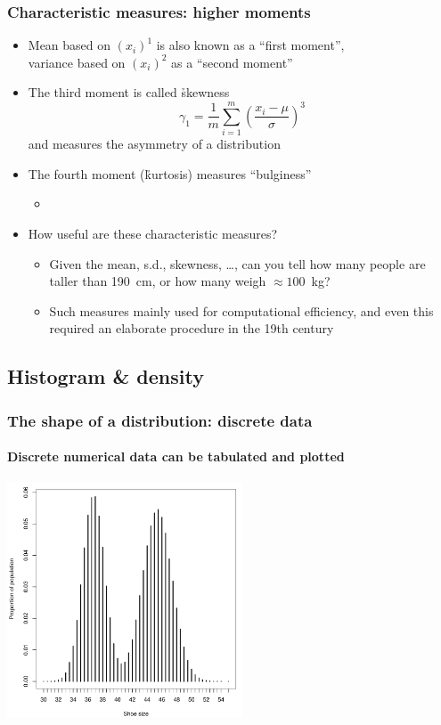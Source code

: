 \documentclass[t]{beamer} %
\begin{document}
\begin{frame}
  \frametitle{Characteristic measures: higher moments}

  \begin{itemize}
  \item Mean based on $(x_i)^1$ is also known as a ``first moment'',\\
    variance based on $(x_i)^2$ as a ``second moment''
  \item The third moment is called \h{skewness}
    \[
    \gamma_1 = \frac{1}{m} \sum_{i=1}^m \left( 
      \frac{x_i - \mu}{\sigma}
    \right)^3
    \]
    and measures the asymmetry of a distribution
  \item The fourth moment (\h{kurtosis}) measures ``bulginess''
    \begin{itemize}
    \item[]\pause
    \end{itemize}
  \item How useful are these characteristic measures?
    \begin{itemize}
    \item Given the mean, s.d., skewness, \ldots, can you tell how many people
      are taller than 190~cm, or how many weigh $\approx 100$~kg?
    \item Such measures mainly used for computational efficiency, and even
      this required an elaborate procedure in the 19th century
    \end{itemize}
  \end{itemize}
\end{frame}

\subsection{Histogram \& density}

\begin{frame}
  \frametitle{The shape of a distribution: discrete data}
  \framesubtitle{Discrete numerical data can be tabulated and plotted}

  \ungap
  \begin{center}
    \includegraphics[width=7cm]{img/ingary_shoesize_table}
  \end{center}
\end{frame}
\end{document}
